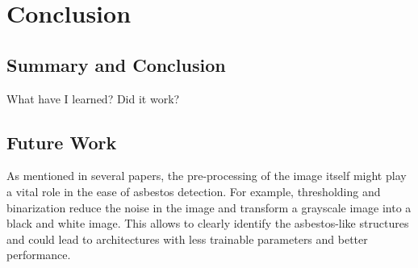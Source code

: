 \chapter{Conclusion}

\section{Summary and Conclusion}

What have I learned? Did it work?

\section{Future Work}

As mentioned in several papers, the pre-processing of the image itself might play a vital role in the ease of asbestos detection. For example, thresholding and binarization reduce the noise in the image and transform a grayscale image into a black and white image. This allows to clearly identify the asbestos-like structures and could lead to architectures with less trainable parameters and better performance.